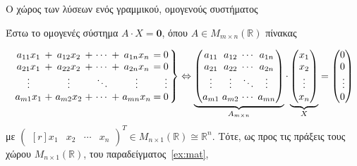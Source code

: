 \begin{example}\label{ex:omsy} 
  \textcolor{Col2}{Ο χώρος των λύσεων ενός γραμμικού, ομογενούς 
  συστήματος}

  Έστω το ομογενές σύστημα $ A\cdot X = \mathbf{0} $, όπου 
  $ A \in M_{m \times n}( \mathbb{R}) $ πίνακας

  \begin{equation*}
    \setlength\arraycolsep{1.5pt} 
    \left.
      \begin{array}{ccc ccc c @{\extracolsep{2.5pt}}c
        @{\extracolsep{2.5pt}}c}
        a_{11}x_{1} & + & a_{12}x_{2} & + & \cdots & + & a_{1n}x_{n} & =
                    & 0 \\
        a_{21}x_{1} & + & a_{22}x_{2} & + & \cdots & + & a_{2n}x_{n} & =
                    & 0 \\
        \vdots & & \vdots & & \ddots & &  \vdots & &  \vdots \\
        a_{m1}x_{1} & + & a_{m2}x_{2} & + & \cdots & + & a_{mn}x_{n} & =
                    & 0 \\
      \end{array}
    \right\} \Leftrightarrow
    \underbrace{\begin{pmatrix}
        a_{11} & a_{12} & \cdots & a_{1n} \\
        a_{21} & a_{22} & \cdots & a_{2n} \\
        \vdots & \vdots & \ddots & \vdots \\
        a_{m1} & a_{m2} & \cdots & a_{mn} 
    \end{pmatrix}}_{A_{m \times n}}
    \cdot 
    \underbrace{\begin{pmatrix*}
        x_{1} \\
        x_{2} \\
        \vdots \\
        x_{n}
    \end{pmatrix*}}_{X} = 
    \begin{pmatrix*}[r]
      0 \\
      0 \\
      \vdots \\
      0
    \end{pmatrix*}
  \end{equation*} 
  με $ \begin{pmatrix*}[r]
    x_{1} & x_{2} & \cdots & x_{n} 
  \end{pmatrix*}^{T} \in M_{n \times 1}(\mathbb{R}) \cong \mathbb{R}^{n} $.
  Τότε, ως προς τις πράξεις τους χώρου 
  $ M_{n \times 1}(\mathbb{R}) $, του παραδείγματος~\ref{ex:mat}, 

\end{example}
